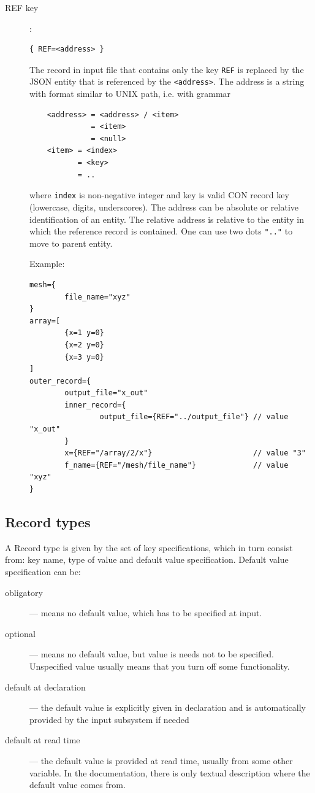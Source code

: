 \begin{description}



\item[REF key]:
\begin{verbatim}
{ REF=<address> }
\end{verbatim}
The record in input file that contains only the key \verb'REF' is replaced by the JSON entity that is referenced by the \verb'<address>'. 
The address is a string with format similar to UNIX path, i.e. with grammar
\begin{verbatim}
    <address> = <address> / <item>
              = <item>  
              = <null>
    <item> = <index>
           = <key>
           = ..
\end{verbatim}
where \verb'index' is non-negative integer and key is valid CON record key (lowercase, digits, underscores).
The address can be absolute or relative identification of an entity. The relative address is relative to the entity in which the reference record is contained.
One can use two dots \verb'".."' to move to parent entity.

Example:
\begin{verbatim}
mesh={
        file_name="xyz"
}
array=[
        {x=1 y=0}       
        {x=2 y=0}
        {x=3 y=0}
]               
outer_record={
        output_file="x_out"
        inner_record={
                output_file={REF="../output_file"} // value "x_out"
        }
        x={REF="/array/2/x"}                       // value "3"
        f_name={REF="/mesh/file_name"}             // value "xyz"
}       
\end{verbatim}
\end{description}

\subsection{Record types}
A Record type is given by the set of key specifications, which in turn consist from: key name, type of value and default value specification.
Default value specification can be:
\begin{description} 
 \item[obligatory] --- means no default value, which has to be specified at input. 
 \item[optional] --- means no default value, but value is needs not to be specified. Unspecified value usually means that you turn off some functionality.
 \item[default at declaration] --- the default value is explicitly given in declaration and is automatically provided by the input subsystem if needed
 \item[default at read time] --- the default value is provided at read time, usually from some other variable. In the documentation, 
 there is only textual description where the default value comes from.
\end{description}

